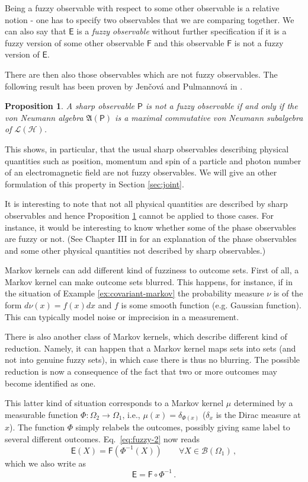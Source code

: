 \documentclass[12pt]{amsart}
\newtheorem{proposition}{Proposition}
\theoremstyle{definition}
\newcommand{\lh}{\mathcal{L(H)}} %
\newcommand{\Eo}{\mathsf{E}} %
\newcommand{\Fo}{\mathsf{F}} %
\newcommand{\PP}{\mathsf{P}} %
\newcommand{\bor}[1]{\mathcal{B}(#1)} %
\begin{document}
Being a fuzzy observable with respect to some other observable is a relative notion - one has to specify two observables that we are comparing together. We can also say that $\Eo$ is a \emph{fuzzy observable} without further specification if it is a fuzzy version of some other observable $\Fo$ and this observable $\Fo$ is not a fuzzy version of $\Eo$.

There are then also those observables which are not fuzzy observables. The following result has been proven by Jen\v{c}ov\'{a} and Pulmannov\'{a} in \cite{JePu07}.

\begin{proposition}\label{prop:not-fuzzy-1}
A sharp observable $\PP$ is not a fuzzy observable if and only if the von Neumann algebra ${\mathfrak A}(\PP)$ is a maximal commutative von Neumann subalgebra of $\lh$.
\end{proposition}

This shows, in particular, that the usual sharp observables describing physical quantities such as position, momentum and spin of a particle and photon number of an electromagnetic field are not fuzzy observables. We will give an other formulation of this property in Section \ref{sec:joint}.

It is interesting to note that not all physical quantities are described by sharp observables and hence Proposition \ref{prop:not-fuzzy-1} cannot be applied to those cases. For instance,  it would be interesting to know whether some of the phase observables are fuzzy or not. (See Chapter III in \cite{OQP97} for an explanation of the phase observables and some other physical quantities not described by sharp observables.)

Markov kernels can add different kind of fuzziness to outcome sets. First of all, a Markov kernel can make outcome sets blurred. This happens, for instance, if in the situation of Example \ref{ex:covariant-markov} the probability measure $\nu$ is of the form $d\nu(x)=f(x)dx$ and $f$ is some smooth function (e.g. Gaussian function). This can typically model noise or imprecision in a measurement.

There is also another class of Markov kernels, which describe different kind of reduction. Namely, it can happen that a Markov kernel maps sets into sets (and not into genuine fuzzy sets), in which case there is thus no blurring. The possible reduction is now a consequence of the fact that two or more outcomes may become identified as one.

This latter kind of situation corresponds to a Markov kernel $\mu$ determined by a measurable function $\Phi:\Omega_2\to\Omega_1$, i.e., $\mu(x) = \delta_{\Phi(x)}$ ($\delta_x$ is the Dirac measure at $x$). The function $\Phi$ simply relabels the outcomes, possibly giving same label to several different outcomes. Eq.~\eqref{eq:fuzzy-2} now reads
\begin{equation}\label{eq:fuzzy-function}
\Eo(X)=\Fo(\Phi^{-1}(X)) \qquad \forall X\in\bor{\Omega_1} \, ,
\end{equation}
which we also write as
\begin{equation*}
\Eo=\Fo \circ \Phi^{-1} \, .
\end{equation*}
\end{document}
